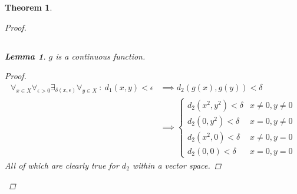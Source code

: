 \documentclass[]{article}
\newcommand{\st}{\ : \ }
\newtheorem{theorem}{Theorem}
\newtheorem{lemma}{Lemma}
\begin{document}
\begin{theorem}
\begin{proof}
        \subsection{}
        \begin{lemma}
            $g$ is a continuous function.
            \begin{proof}
                \begin{align*}
                    \forall_{x \in X} \forall_{\epsilon > 0} \exists_{\delta(x, \epsilon)} \forall_{y \in X} \st d_1(x,y) < \epsilon
                        &\implies d_2(g(x), g(y)) < \delta\\
                        &\implies 
                        \begin{cases}
                            d_2(x^2, y^2) < \delta &x \neq 0, y \neq 0\\
                            d_2(0, y^2) < \delta & x = 0, y \neq 0\\
                            d_2(x^2, 0) < \delta & x \neq 0, y = 0\\
                            d_2(0, 0) < \delta & x = 0, y = 0
                        \end{cases}
                \end{align*}
                All of which are clearly true for $d_2$ within a vector space.
            \end{proof}
        \end{lemma}


\end{proof}
\end{theorem}
\end{document}
